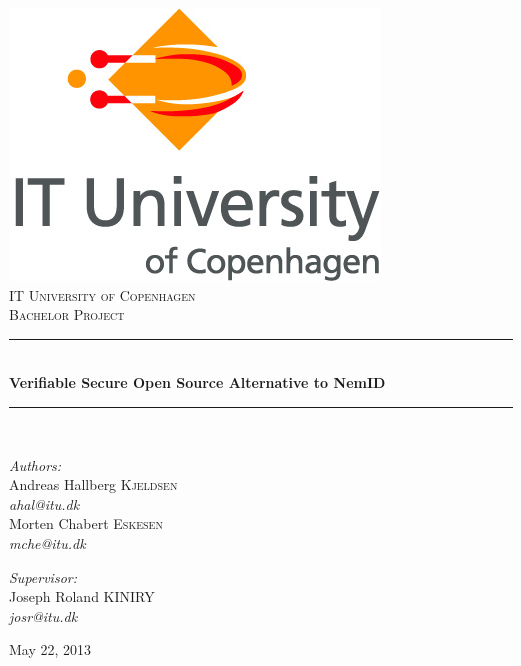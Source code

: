 \documentclass[twosided]{report}
\newcommand{\HRule}{\rule{\linewidth}{0.5mm}}
\begin{document}
\begin{titlepage}
\begin{center}

\includegraphics[scale=0.4]{images/ITULogo.jpg}\\[1cm]

\textsc{\LARGE IT University of Copenhagen}\\[1.5cm]

\textsc{\Large Bachelor Project}\\[0.5cm]

\HRule \\[0.4cm]
{\huge \bfseries Verifiable Secure Open Source Alternative to NemID}\\[0.1cm]
\HRule \\[1.5cm]

\begin{minipage}[t]{0.45\textwidth}
\begin{flushleft} \large
\emph{Authors:}
\\[10pt]
Andreas Hallberg \textsc{Kjeldsen}\\
\emph{ahal@itu.dk}
\\[10pt]
Morten Chabert \textsc{Eskesen}\\
\emph{mche@itu.dk}\\
\end{flushleft}
\end{minipage}
\begin{minipage}[t]{0.45\textwidth}
\begin{flushright} \large
\emph{Supervisor:}
\\[10pt]
Joseph Roland \textsc{KINIRY}\\
\emph{josr@itu.dk}
\end{flushright}
\end{minipage}

\vfill

{\large May 22, 2013}

\end{center}
\end{titlepage}
\end{document}
